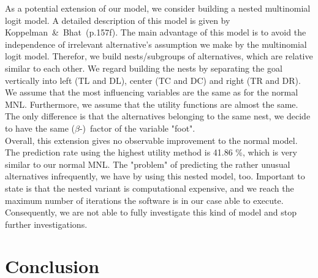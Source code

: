 \documentclass[12pt,dvipsnames]{article}%
\begin{document}
As a potential extension of our model, we consider building a nested multinomial logit model. A detailed description of this model is given by \mbox{Koppelman \& Bhat (p.157f)}. The main advantage of this model is to avoid the independence of irrelevant alternative's assumption we make by the multinomial logit model. Therefor, we build nests/subgroups of alternatives, which are relative similar to each other. We regard building the nests by separating the goal vertically into left (TL and DL), center (TC and DC) and right (TR and DR). We assume that the most influencing variables are the same as for the normal MNL. Furthermore, we assume that the utility functions are almost the same. The only difference is that the alternatives belonging to the same nest, we decide to have the same \mbox{($\beta$-) factor} of the variable "foot". \\
 Overall, this extension gives no observable improvement to the normal model. The prediction rate using the highest utility method is 41.86 \%, which is very similar to our normal MNL. The "problem" of predicting the rather unusual alternatives infrequently, we have by using this nested model, too. Important to state is that the nested variant is computational expensive, and we reach the maximum number of iterations the software is in our case able to execute. Consequently, we are not able to fully investigate this kind of model and stop further investigations.


\section{Conclusion}
\end{document}
